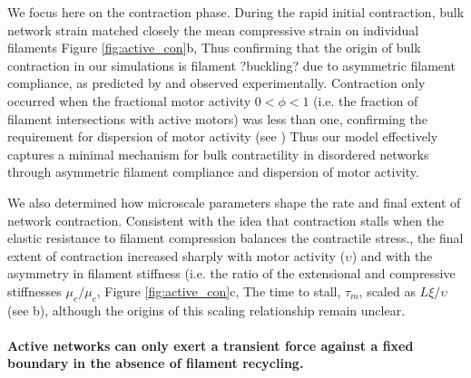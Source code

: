 \documentclass[10pt,letterpaper]{article}
\begin{document}
We focus here on the contraction phase. During the rapid initial contraction, bulk network strain matched closely the mean compressive strain on individual filaments Figure \ref{fig:active_con}b, Thus  confirming that the origin of bulk contraction in our simulations is filament ?buckling? due to asymmetric filament compliance, as predicted by \cite{1367-2630-14-3-033037,PhysRevX.4.041002} and observed experimentally\cite{rheo_2D1}. Contraction only occurred when the fractional motor activity $0<\phi<1$ (i.e. the fraction of filament intersections with active motors) was less than one, confirming the requirement for dispersion of motor activity (see ) Thus our model effectively captures a minimal mechanism for bulk contractility in disordered networks through asymmetric filament compliance and dispersion of motor activity.

We also determined how microscale parameters shape the rate and final extent of network contraction. Consistent with the idea that contraction stalls when the elastic resistance to filament compression balances the contractile stress., the final extent of contraction increased sharply with motor activity ($\upsilon$) and with the asymmetry in filament stiffness (i.e. the ratio of the extensional and compressive stiffnesses $\mu_e/\mu_c$, Figure \ref{fig:active_con}c,  The time to stall, $\tau_m$, scaled as $L\xi/\upsilon$ (see b), although the origins of this scaling relationship remain unclear. 


\paragraph{Active networks can only exert a transient force against a fixed boundary in the absence of filament recycling.}
\end{document}
